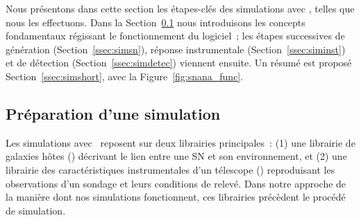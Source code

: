 \documentclass[../main/main.tex]{subfiles}
\begin{document}
Nous présentons dans cette section les étapes-clés des simulations avec \snana,
telles que nous les effectuons. Dans la Section~\ref{ssec:simprep} nous
introduisons les concepts fondamentaux régissant le fonctionnement du logiciel~;
les étapes successives de génération (Section~\ref{ssec:simsn}), réponse
instrumentale (Section~\ref{ssec:siminst}) et de détection
(Section~\ref{ssec:simdetec}) viennent ensuite. Un résumé est proposé
Section~\ref{ssec:simshort}, avec la Figure~\ref{fig:snana_func}.

\subsection{Préparation d'une simulation}\label{ssec:simprep}

Les simulations avec \snana\ reposent sur deux librairies principales~: (1) une
librairie de galaxies hôtes (\hostlib) décrivant le lien entre une SN et son
environnement, et (2) une librairie des caractéristiques instrumentales d'un
télescope (\simlib) reproduisant les observations d'un sondage et leurs
conditions de relevé. Dans notre approche de la manière dont nos simulations
fonctionnent, ces librairies précèdent le procédé de simulation.

\subsubsection{\hostlib}\label{sssec:simlib}
\end{document}
